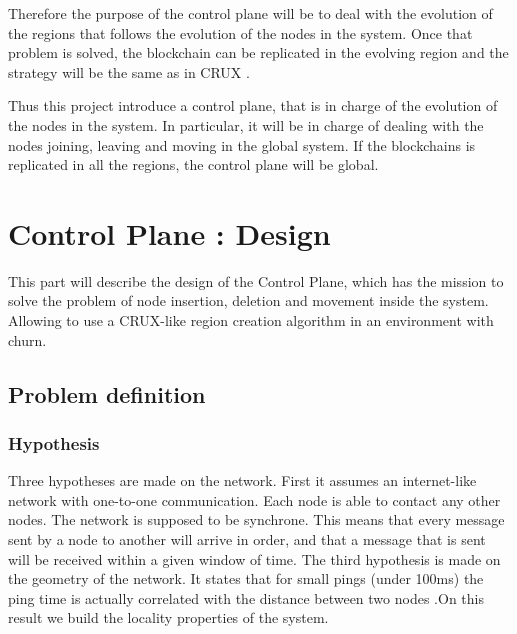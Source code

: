 \documentclass[a4paper,11pt,oneside]{report}
\begin{document}
Therefore the purpose of the control plane will be to deal with the evolution
of the regions that follows the evolution of the nodes in the system. Once that
problem is solved, the blockchain can be replicated in the evolving region and
the strategy will be the same as in CRUX \cite{Basescu2014}. 

Thus this project introduce a control plane, that is in charge of the evolution
of the nodes in the system. In particular, it will be in charge of dealing with
the nodes joining, leaving and moving in the global system. If the blockchains
is replicated in all the regions, the control plane will be global. 

\chapter{Control Plane : Design}

This part will describe the design of the Control Plane, which has the mission
to solve the problem of node insertion, deletion and movement inside the
system. Allowing to use a CRUX-like region creation algorithm in an environment
with churn. 

\section{Problem definition}

\subsection{Hypothesis} Three hypotheses are made on the network. First it
assumes an internet-like network with one-to-one communication. Each node is
able to contact any other nodes. The network is supposed to be synchrone. This
means that every message sent by a node to another will arrive in order, and
that a message that is sent will be received within a given window of time. The
third hypothesis is made on the geometry of the network. It states that for
small pings (under 100ms) the ping time is actually correlated with the
distance between two nodes \cite{Seibert2014} .On this result we build the
locality properties of the system. 
\end{document}
